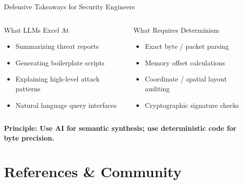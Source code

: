 \documentclass[aspectratio=169,11pt,xcolor={table,dvipsnames}]{beamer}
\begin{document}
\begin{frame}{Defensive Takeaways for Security Engineers}
  \begin{columns}[T]
      \begin{block}{What LLMs Excel At}
        \begin{itemize}
          \item Summarizing threat reports
          \item Generating boilerplate scripts
          \item Explaining high-level attack patterns
          \item Natural language query interfaces
        \end{itemize}
      \end{block}

      \begin{alertblock}{What Requires Determinism}
        \begin{itemize}
          \item Exact byte / packet parsing
          \item Memory offset calculations
          \item Coordinate / spatial layout auditing
          \item Cryptographic signature checks
        \end{itemize}
      \end{alertblock}
  \end{columns}

  \vspace{0.4cm}
  \centering
  \small\textcolor{accentamber}{\textbf{Principle: Use AI for semantic synthesis; use deterministic code for byte precision.}}
\end{frame}

\section{References \& Community}
\end{document}
